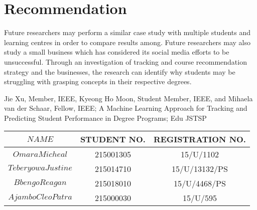 \documentclass{article}
\begin{document}
\section{Recommendation}
Future researchers may perform a similar case study with multiple students and learning centres in order to compare results among. Future researchers may also study a small business which has considered its
social media efforts to be unsuccessful. Through an investigation of tracking and course recommendation strategy and the businesses, the research can identify why students may be struggling with grasping concepts in their respective degrees.

\begin{thebibliography}{9}
Jie Xu, Member, IEEE, Kyeong Ho Moon, Student Member, IEEE, and Mihaela van der Schaar, Fellow, IEEE; A Machine Learning Approach for Tracking and Predicting Student Performance in Degree Programs; Edu JSTSP

 
\end{thebibliography}



\begin{tabular}{|c|c|c|}
	
	
\hline	$NAME$ & STUDENT NO. & REGISTRATION NO. \\ \hline
\hline	$Omara Micheal$ & 215001305 &15/U/1102 \\ \hline
\hline	$Teberyowa Justine$ &215014710 & 15/U/13132/PS \\ \hline
\hline	$Bbengo Reagan$ & 215018010 & 15/U/4468/PS \\ \hline
\hline	$Ajambo Cleo Patra$ & 215000030 & 15/U/595 \\ \hline
	
	
\end{tabular}
\end{document}
